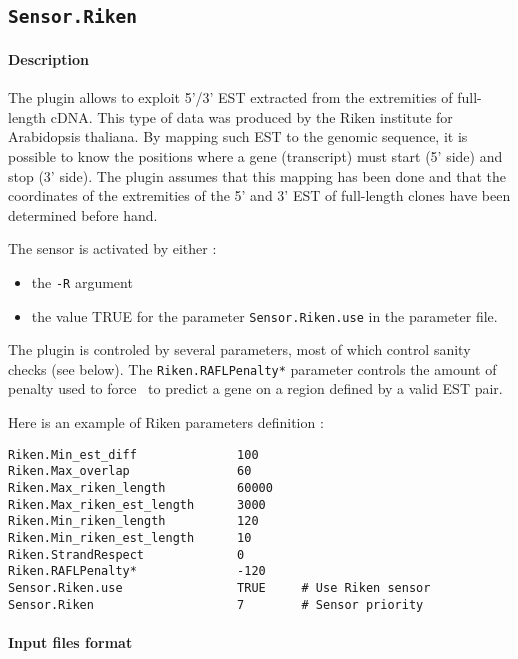 
\subsection{\texttt{Sensor.Riken}}

\paragraph{Description}

The plugin allows to exploit 5'/3' EST extracted from the extremities
of full-length cDNA. This type of data was produced by the Riken
institute for Arabidopsis thaliana. By mapping such EST to the genomic
sequence, it is possible to know the positions where a gene
(transcript) must start (5' side) and stop (3' side). The plugin
assumes that this mapping has been done and that the coordinates of
the extremities of the 5' and 3' EST of full-length clones have been
determined before hand.

The sensor is activated by either :
\begin{itemize}
\item the \texttt{-R} argument 
\item the value TRUE for the parameter \texttt{Sensor.Riken.use} in the
  parameter file.
\end{itemize}

The plugin is controled by several parameters, most of which control
sanity checks (see below). The \texttt{Riken.RAFLPenalty*} parameter
controls the amount of penalty used to force \EuGene\ to predict a
gene on a region defined by a valid EST pair.

Here is an example of Riken parameters definition :
\begin{Verbatim}[fontsize=\small]
Riken.Min_est_diff              100
Riken.Max_overlap               60
Riken.Max_riken_length          60000
Riken.Max_riken_est_length      3000
Riken.Min_riken_length          120 
Riken.Min_riken_est_length      10
Riken.StrandRespect             0
Riken.RAFLPenalty*              -120
Sensor.Riken.use                TRUE     # Use Riken sensor
Sensor.Riken                    7        # Sensor priority
\end{Verbatim}

\paragraph{Input files format}

